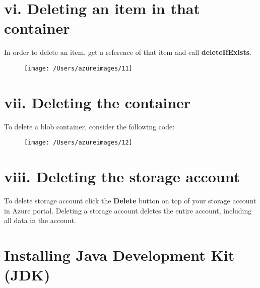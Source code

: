 \documentclass[12pt, letterpaper, twoside]{article}
\begin{document}
\cleardoublepage 		
\section*{vi. Deleting an item in that container}
In order to delete an item, get a reference of that item and call \textbf{deleteIfExists}.
\begin{figure}[H]
	\centering
	\texttt{[image: /Users/azureimages/11]}
\end{figure}
\section*{vii. Deleting the container}
To delete a blob container, consider the following code:
\begin{figure}[H]
	\centering
	\texttt{[image: /Users/azureimages/12]}
\end{figure}
\vspace{1cm}
 \section*{viii. Deleting the storage account}	
 To delete storage account click the \textbf{Delete} button on top of your storage account in Azure portal. Deleting a storage account deletes the entire account, including all data in the account.	
 \vspace{2cm}		
\section*{Installing Java Development Kit (JDK)}		
 		
\end{document}
